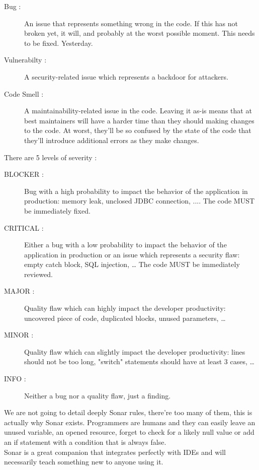 \begin{description}
    \item[Bug :]
    An issue that represents something wrong in the code.
    If this has not broken yet, it will, and probably at the worst
    possible moment.
    This needs to be fixed.
    Yesterday.
    \item[Vulnerabilty :]
    A security-related issue which represents a backdoor for attackers.
    \item[Code Smell :]
    A maintainability-related issue in the code.
    Leaving it as-is means that at best maintainers will have a harder
    time than they should making changes to the code.
    At worst, they'll be so confused by the state of the code that
    they'll introduce additional errors as they make changes.
\end{description}
There are 5 levels of severity :
\begin{description}
    \item[BLOCKER :]
Bug with a high probability to impact the behavior of the application
in production: memory leak, unclosed JDBC connection, ....
The code MUST be immediately fixed.
    \item[CRITICAL :]
Either a bug with a low probability to impact the behavior of the
application in production or an issue which represents a
security flaw: empty catch block, SQL injection, \ldots
The code MUST be immediately reviewed.
    \item[MAJOR :]
Quality flaw which can highly impact the developer productivity:
uncovered piece of code, duplicated blocks, unused parameters,
    \ldots
    \item[MINOR :]
Quality flaw which can slightly impact the developer productivity:
lines should not be too long, "switch" statements should have at
least 3 cases, \ldots
    \item[INFO :]
Neither a bug nor a quality flaw, just a finding.
\end{description}

We are not going to detail deeply Sonar rules, there're too many of them,
this is actually why Sonar exists.
Programmers are humans and they can easily leave an unused variable, an
opened resource, forget to check for a likely null value or add an if
statement with a condition that is always false. \\
Sonar is a great companion that integrates perfectly with IDEs and will
necessarily teach something new to anyone using it.

